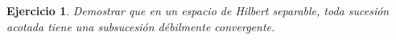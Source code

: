 \documentclass[11pt]{report}
\newtheorem{ex}{Ejercicio}
\newenvironment{solution}{\begin{proof}[Solución]}{\end{proof}}
\newcommand{\inner}[2]{( #1, #2 )_V}
\begin{document}








\begin{ex}
Demostrar que en un espacio de Hilbert separable, toda sucesión acotada tiene una subsucesión débilmente convergente.
\end{ex}



\end{document}
